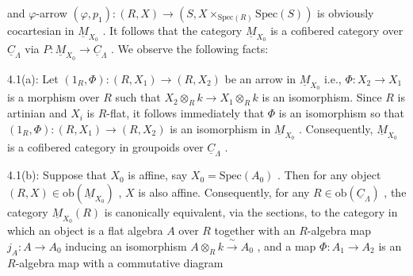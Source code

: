 \begin{center}
\end{center}
and $\varphi$-arrow $(\varphi, p_1) : (R, X) \to (S, X \times_{\mathrm{Spec}(R)} \mathrm{Spec}(S))$ is obviously cocartesian in $\underline{M}_{X_0}$ . It follows that the category $\underline{M}_{X_0}$ is a cofibered category over $\underline{C}_\Lambda$ via $P : \underline{M}_{X_0} \to \underline{C}_\Lambda$ . We observe the following facts:



4.1(a): Let $(1_R, \Phi) : (R, X_1) \to (R, X_2)$ be an arrow in $\underline{M}_{X_0}$ i.e., $\Phi : X_2 \to X_1$ is a morphism over $R$ such that $X_2 \otimes_R k \to X_1 \otimes_R k$ is an isomorphism. Since $R$ is artinian and $X_i$ is $R$-flat, it follows immediately that $\Phi$ is an isomorphism so that $(1_R, \Phi) : (R, X_1) \to (R, X_2)$ is an isomorphism in $\underline{M}_{X_0}$ . Consequently, $\underline{M}_{X_0}$ is a cofibered category in groupoids over $\underline{C}_\Lambda$ .

4.1(b): Suppose that $X_0$ is affine, say $X_0 = \mathrm{Spec}(A_0)$ . Then for any object $(R, X) \in \mathrm{ob}(\underline{M}_{X_0})$ , $X$ is also affine. Consequently, for any $R \in \mathrm{ob}(\underline{C}_\Lambda)$ , the category $\underline{M}_{X_0}(R)$ is canonically equivalent, via the sections, to the category in which an object is a flat algebra $A$ over $R$ together with an $R$-algebra map $j_A : A \to A_0$ inducing an isomorphism $A \otimes_R k \xrightarrow{\ \sim\ } A_0$ , and a map $\Phi : A_1 \to A_2$ is an $R$-algebra map with a commutative diagram

